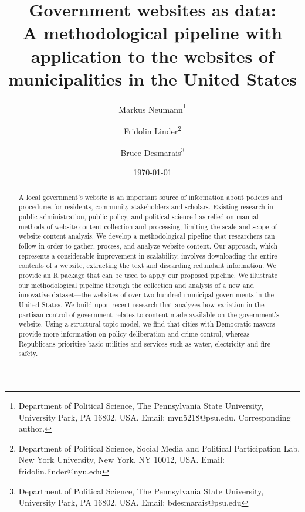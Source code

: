 \documentclass[11pt]{article}
\title{\vspace{-2cm} Government websites as data: \\ A methodological pipeline with application to the websites of municipalities in the United States}
\author{ Markus Neumann\footnote{Department of Political Science, The Pennsylvania State University, University Park, PA 16802, USA. Email: mvn5218@psu.edu. Corresponding author.} \and Fridolin Linder\footnote{Department of Political Science, Social Media and Political Participation Lab, New York University, New York, NY 10012, USA. Email: fridolin.linder@nyu.edu} \and Bruce Desmarais\footnote{Department of Political Science, The Pennsylvania State University, University Park, PA 16802, USA. Email: bdesmarais@psu.edu}} \date{\today}
\begin{document}
\maketitle




\begin{abstract}

A local government's website is an important source of information about policies and procedures for residents, community stakeholders and scholars. Existing research in public administration, public policy, and political science has relied on manual methods of website content collection and processing, limiting the scale and scope of website content analysis. We develop a methodological pipeline that researchers can follow in order to gather, process, and analyze website content. Our approach, which represents a considerable improvement in scalability, involves downloading the entire contents of a website, extracting the text and discarding redundant information. We provide an R package that can be used to apply our proposed pipeline. We illustrate our methodological pipeline through the collection and analysis of a new and innovative dataset---the websites of over two hundred municipal governments in the United States. We build upon recent research that analyzes how variation in the partisan control of government relates to content made available on the government's website. Using a structural topic model, we find that cities with Democratic mayors provide more information on policy deliberation and crime control, whereas Republicans prioritize basic utilities and services such as water, electricity and fire safety.

\end{abstract}
\thispagestyle{empty}
\doublespacing
\end{document}
